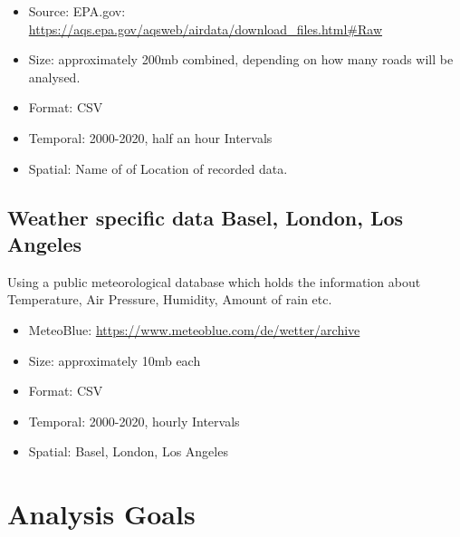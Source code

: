\documentclass{article}
\begin{document}
\begin{itemize}
	\item Source: EPA.gov: \url{https://aqs.epa.gov/aqsweb/airdata/download_files.html#Raw}

	\item Size: approximately 200mb combined, depending on how many roads will be analysed.
	\item Format: CSV
	\item Temporal: 2000-2020, half an hour Intervals
	\item Spatial: Name of of Location of recorded data.
\end{itemize}


\subsection{Weather specific data Basel, London, Los Angeles}

Using a public meteorological database which holds the information about Temperature, Air Pressure, Humidity, Amount of rain etc.

\begin{itemize}
	\item MeteoBlue: \url{https://www.meteoblue.com/de/wetter/archive}
	\item Size: approximately 10mb each
	\item Format: CSV
	\item Temporal: 2000-2020, hourly Intervals
	\item Spatial: Basel, London, Los Angeles

\end{itemize}




\section{Analysis Goals}
\end{document}
